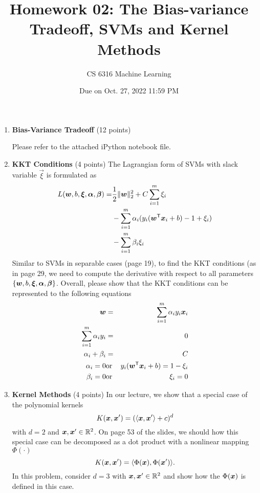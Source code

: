 \documentclass[10pt]{article}
\title{Homework 02: The Bias-variance Tradeoff, SVMs and Kernel Methods}
\author{CS 6316 Machine Learning}
\date{Due on Oct. 27, 2022 11:59 PM}
\begin{document}
 
\maketitle

\begin{enumerate}
\item \textbf{Bias-Variance Tradeoff} (12 points)

Please refer to the attached iPython notebook file.

\item \textbf{KKT Conditions} (4 points) The Lagrangian form of SVMs with slack variable $\vec{\xi}$ is formulated as
  \begin{equation}
    \label{eq:non-sep-svm}
    \begin{split}
      L(\boldsymbol{w},b,\bm{\xi},\bm{\alpha},\bm{\beta})= & \frac{1}{2}\|\boldsymbol{w}\|_2^2 + C\sum_{i=1}^{m}\xi_i\\
      & -\sum_{i=1}^{m}\alpha_i(y_i(\boldsymbol{w}^{\textsf{T}}\boldsymbol{x}_i+b)-1+\xi_i)\\
      & - \sum_{i=1}^{m}\beta_i\xi_i
    \end{split}
  \end{equation}
  Similar to SVMs in separable cases (page 19), to find the KKT conditions (as in page 29, we need to compute the derivative with respect to all parameters $\{\boldsymbol{w},b,\bm{\xi},\bm{\alpha},\bm{\beta}\}$. Overall, please show that the KKT conditions can be represented to the following equations
  \begin{eqnarray}
    \boldsymbol{w} &=& \sum_{i=1}^{m}{\alpha_i}y_i\boldsymbol{x}_i\\
    \sum_{i=1}^{m}\alpha_iy_i &=& 0 \\
    \alpha_i + \beta_i &=& C\\
    \alpha_i = 0 &\text{or}& y_i(\boldsymbol{w}^{\textsf{T}}\boldsymbol{x}_i + b) = 1 - \xi_i\\
    \beta_i = 0 &\text{or}& \xi_i = 0
  \end{eqnarray}
\item \textbf{Kernel Methods} (4 points) In our lecture, we show that a special case of the polynomial kernels
  \begin{equation}
    K(\boldsymbol{x},\boldsymbol{x}') = (\langle \boldsymbol{x}, \boldsymbol{x}'\rangle + c)^d
  \end{equation}
  with $d=2$ and $\boldsymbol{x},\boldsymbol{x}'\in\mathbb{R}^2$.
  On page 53 of the slides, we should how this special case can be decomposed as a dot product with a nonlinear mapping $\Phi(\cdot)$
  \begin{equation}
    K(\boldsymbol{x},\boldsymbol{x}') = \langle \Phi(\boldsymbol{x}), \Phi(\boldsymbol{x}')\rangle.
  \end{equation}
  In this problem, consider $d=3$ with $\boldsymbol{x},\boldsymbol{x}'\in\mathbb{R}^2$ and show how the $\Phi(\boldsymbol{x})$ is defined in this case. 
\end{enumerate}

\end{document}
